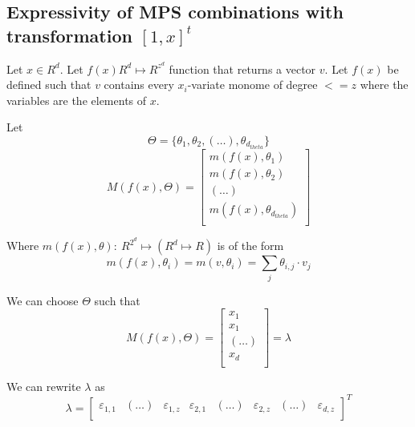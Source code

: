 \documentclass[11pt]{article}
\begin{document}
\subsection{Expressivity of MPS combinations with transformation $[1,x]^t$}
Let $x \in R^d$.
Let $f(x) R^d \mapsto R^{z^d}$ function that returns a vector $v$.
Let $f(x)$ be defined such that $v$ contains every 
$x_i$-variate monome of degree $<= z$ where the variables are the elements of $x$. 

Let 
\begin{equation}
    \Theta = \{ \theta_1, \theta_2, (\dots), \theta_{d_{theta}} \}
\end{equation}
\begin{equation}
    M(f(x), \Theta)
    = 
    \begin{bmatrix}
        m(f(x), \theta_1) \\
        m(f(x), \theta_2) \\
        (\dots) \\
        m(f(x), \theta_{d_{theta}}) \\
    \end{bmatrix}
\end{equation}

Where $m(f(x), \theta): \ R^{2^d} \mapsto (R^d \mapsto R)$ is of the form
\begin{equation}
    m(f(x), \theta_i)
    = 
    m(v, \theta_i)
    =
    \sum_j \theta_{i,j} \cdot v_j
\end{equation}

We can choose $\Theta$ such that 
\begin{equation}
    M(f(x), \Theta)
    = 
    \begin{bmatrix}
        x_1 \\
        x_1 \\
        (\dots) \\
        x_d \\
    \end{bmatrix}
    = \lambda
\end{equation}

We can rewrite $\lambda$ as
\begin{equation}
    \lambda 
    = 
    \begin{bmatrix}
        \varepsilon_{1, 1} &
        (\dots) &
        \varepsilon_{1, z} &
        \varepsilon_{2, 1} &
        (\dots) &
        \varepsilon_{2, z} &
        (\dots) &
        \varepsilon_{d, z} \\
    \end{bmatrix}^T
\end{equation}
\end{document}
